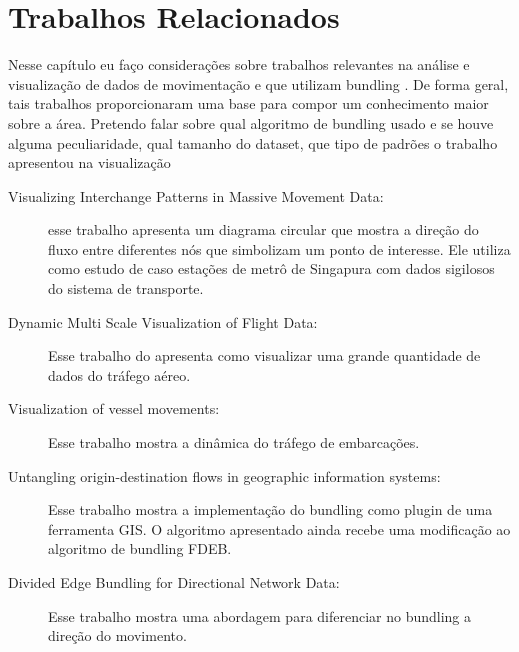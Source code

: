 \chapter{Trabalhos Relacionados}
\label{cap:trabalhos-relacionados}

Nesse capítulo eu faço considerações sobre trabalhos relevantes na análise e
visualização de dados de movimentação e que utilizam bundling .  De forma
geral, tais trabalhos proporcionaram uma base para compor um conhecimento maior
sobre  a área. Pretendo falar sobre qual algoritmo de bundling usado e se houve
alguma peculiaridade, qual tamanho do dataset, que tipo de padrões o trabalho
apresentou na visualização

\begin{description}
  \item[Visualizing Interchange Patterns in Massive Movement Data:] esse
trabalho apresenta um diagrama circular que mostra a direção do fluxo entre
diferentes nós que simbolizam um ponto de interesse. Ele utiliza como estudo de
caso estações de metrô de Singapura com dados sigilosos do sistema de
transporte. \citep{Zeng2013} 

\item[Dynamic Multi Scale Visualization of Flight Data:]
 Esse trabalho do apresenta como visualizar uma grande quantidade
de dados do tráfego aéreo. \citep{Klein2014}

\item[Visualization of vessel movements:]
 Esse trabalho mostra a dinâmica do tráfego de embarcações. \citep{Willems2009}

\item[Untangling origin-destination flows in geographic information systems:]
 Esse trabalho mostra a implementação do bundling como plugin de uma ferramenta GIS.
O algoritmo apresentado ainda recebe uma modificação ao algoritmo de bundling FDEB. \citep{Anita2017}

\item[Divided Edge Bundling for Directional Network Data:]
  Esse trabalho mostra uma abordagem para diferenciar no bundling a direção do movimento.
\citep{Selassie2011}
\end{description}


